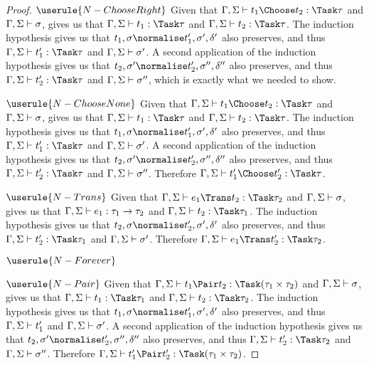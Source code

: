 \begin{proof}
\case
  {$\userule{N-ChooseRight}$}
  {Given that $\Gamma,\Sigma\infers t_1 \Choose t_2 : \Task \tau$ and $\Gamma,\Sigma\vdash\sigma$,  gives us that $\Gamma,\Sigma\infers t_1:\Task\tau$ and $\Gamma,\Sigma\infers t_2:\Task \tau$.
  The induction hypothesis gives us that $t_1,\sigma\normalise t_1',\sigma',\delta'$ also preserves,
  and thus $\Gamma,\Sigma\infers t_1':\Task\tau$ and $\Gamma,\Sigma\vdash \sigma'$.
  A second application of the induction hypothesis gives us that $t_2,\sigma'\normalise t_2',\sigma'',\delta''$ also preserves, and thus $\Gamma,\Sigma\infers t_2':\Task\tau$ and $\Gamma,\Sigma\vdash\sigma''$, which is exactly what we needed to show.}

\case
  {$\userule{N-ChooseNone}$}
  {Given that $\Gamma,\Sigma\infers t_1 \Choose t_2 : \Task \tau$ and $\Gamma,\Sigma\vdash\sigma$,  gives us that $\Gamma,\Sigma\infers t_1:\Task\tau$ and $\Gamma,\Sigma\infers t_2:\Task \tau$.
  The induction hypothesis gives us that $t_1,\sigma\normalise t_1',\sigma',\delta'$ also preserves,
  and thus $\Gamma,\Sigma\infers t_1':\Task\tau$ and $\Gamma,\Sigma\vdash \sigma'$.
  A second application of the induction hypothesis gives us that $t_2,\sigma'\normalise t_2',\sigma'',\delta''$ also preserves, and thus $\Gamma,\Sigma\infers t_2':\Task\tau$ and $\Gamma,\Sigma\vdash\sigma''$.
  Therefore $\Gamma,\Sigma\infers t_1'\Choose t_2':\Task\tau$.}

\case
  {$\userule{N-Trans}$}
  {Given that $\Gamma,\Sigma\infers e_1\Trans t_2:\Task\tau_2$ and $\Gamma,\Sigma\vdash\sigma$,  gives us that $\Gamma,\Sigma\vdash e_1:\tau_1\rightarrow \tau_2$ and $\Gamma,\Sigma\infers t_2:\Task\tau_1$.
  The induction hypothesis gives us that $t_2,\sigma\normalise t_2',\sigma',\delta'$ also preserves, and thus $\Gamma,\Sigma\infers t_2':\Task\tau_1$ and $\Gamma,\Sigma\vdash\sigma'$.
  Therefore $\Gamma,\Sigma\infers e_1\Trans t_2':\Task\tau_2$.}

\case
  {$\userule{N-Forever}$}
  {}

\case
  {$\userule{N-Pair}$}
  {Given that $\Gamma,\Sigma\infers t_1\Pair t_2:\Task (\tau_1\times\tau_2)$ and $\Gamma,\Sigma\vdash\sigma$,  gives us that $\Gamma,\Sigma\infers t_1:\Task \tau_1$ and $\Gamma,\Sigma\infers t_2:\Task \tau_2$.
  The induction hypothesis gives us that $t_1,\sigma\normalise t_1',\sigma',\delta'$ also preserves,
  and thus $\Gamma,\Sigma\vdash t_1'$ and $\Gamma,\Sigma\vdash \sigma'$.
  A second application of the induction hypothesis gives us that $t_2,\sigma'\normalise t_2',\sigma'',\delta''$ also preserves, and thus $\Gamma,\Sigma\infers t_2':\Task\tau_2$ and $\Gamma,\Sigma\vdash \sigma''$.
  Therefore $\Gamma,\Sigma\infers t_1'\Pair t_2':\Task (\tau_1\times\tau_2)$.}


\end{proof}
